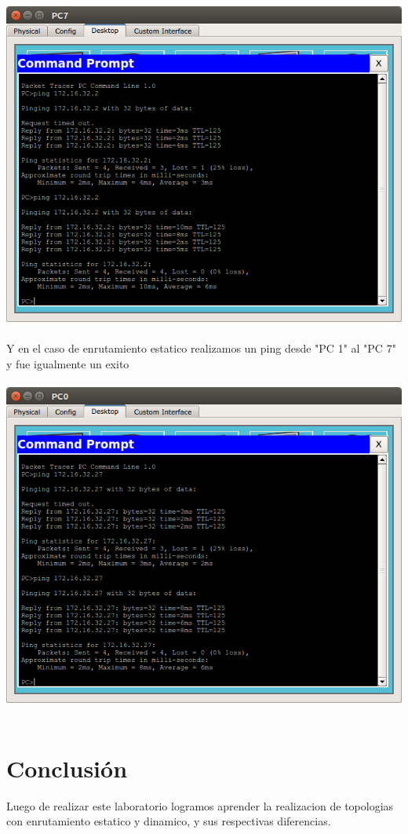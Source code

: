 \documentclass{article}
\begin{document}
\includegraphics[scale=0.6]{enrutamientodinamico.png}\\\\

Y en el caso de enrutamiento estatico realizamos un ping desde "PC 1" al "PC 7" y fue igualmente un exito\\\\

\includegraphics[scale=0.6]{enrutamientoestatico.png}\\\\

\section{Conclusión}
Luego de realizar este laboratorio logramos aprender la realizacion de topologias con enrutamiento estatico y dinamico, y sus respectivas diferencias.\\
\end{document}
